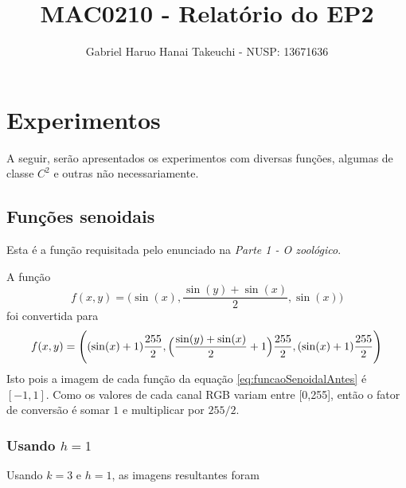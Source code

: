 \documentclass{article}
\author{Gabriel Haruo Hanai Takeuchi - NUSP: 13671636}
\title{MAC0210 - Relatório do EP2}
\date{}
\begin{document}
\maketitle

\section{Experimentos}

A seguir, serão apresentados os experimentos com diversas funções, algumas de classe $C^2$ e outras não necessariamente.

\subsection{Funções senoidais} \label{subsec:funcoesSenoidais}

Esta é a função requisitada pelo enunciado na \textit{Parte 1 - O zoológico}.

A função
\begin{equation} \label{eq:funcaoSenoidalAntes}
  f(x,y) = \Biggl( \sin(x)
  , \dfrac{\sin(y) + \sin(x)}{2}
  , \sin(x) \Biggr)
\end{equation}
foi convertida para
\begin{equation}
  f(x,y) = \Biggl( (\sin(x) + 1) \dfrac{255}{2}
  , \Bigl( \frac{\sin(y) + \sin(x)}{2} + 1 \Bigr) \dfrac{255}{2}
  , (\sin(x) + 1) \dfrac{255}{2} \Biggr)
  \label{eq:funcaoSenoidalDepois}
\end{equation}
Isto pois a imagem de cada função da equação \ref{eq:funcaoSenoidalAntes}
é $[-1,1]$. Como os valores de cada canal RGB variam entre [0,255],
então o fator de conversão é somar $1$ e multiplicar por
$255/2$.

\subsubsection[Usando h=1]{Usando $h=1$}
Usando $k=3$ e $h=1$, as imagens resultantes foram
\end{document}
